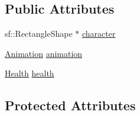\subsection*{Public Attributes}
\begin{DoxyCompactItemize}
\item 
sf\+::\+Rectangle\+Shape $\ast$ \hyperlink{classPrincessObject_a54ed218b17a2ff61f2495dc24e2fe398}{character}
\item 
\hyperlink{classAnimation}{Animation} \hyperlink{classPrincessObject_a6f7289048d5e4bd2eae25c6fd3086acd}{animation}
\item 
\hyperlink{classHealth}{Health} \hyperlink{classPrincessObject_a75a7fc3924a1c6e8ba648d73907f24ce}{health}
\end{DoxyCompactItemize}
\subsection*{Protected Attributes}

